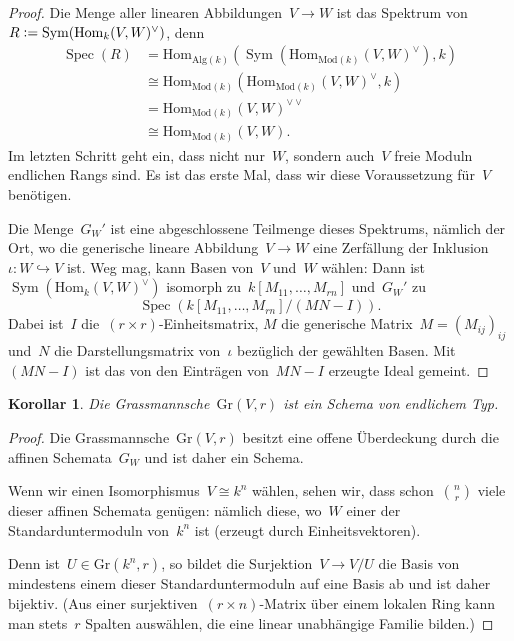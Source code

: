 \documentclass[a4paper,ngerman,12pt]{scrartcl}
\theoremstyle{definition}
\theoremstyle{plain}
\newtheorem{cor}[defn]{Korollar}
\theoremstyle{remark}
\newcommand{\Hom}{\mathrm{Hom}}
\DeclareMathOperator{\Spec}{Spec}
\DeclareMathOperator{\Sym}{Sym}
\newcommand{\defeq}{\vcentcolon=}
\newcommand{\Gr}{\mathrm{Gr}}
\begin{document}
\begin{proof}Die Menge aller linearen Abbildungen~$V \to W$ ist das Spektrum
von~$R \defeq \Sym(\Hom_k(V,W)^\vee)$, denn
\begin{align*}
  \Spec(R) &=
  \Hom_{\mathrm{Alg}(k)}(\Sym(\Hom_{\mathrm{Mod}(k)}(V,W)^\vee), k) \\
  &\cong \Hom_{\mathrm{Mod}(k)}(\Hom_{\mathrm{Mod}(k)}(V,W)^\vee, k) \\
  &=\Hom_{\mathrm{Mod}(k)}(V,W)^{\vee\vee} \\
  &\cong \Hom_{\mathrm{Mod}(k)}(V,W).
\end{align*}
Im letzten Schritt geht ein, dass nicht nur~$W$, sondern auch~$V$ freie Moduln
endlichen Rangs sind. Es ist das erste Mal, dass wir diese Voraussetzung
für~$V$ benötigen.

Die Menge~$G_W'$ ist eine abgeschlossene Teilmenge dieses Spektrums, nämlich
der Ort, wo die generische lineare Abbildung~$V \to W$ eine Zerfällung der
Inklusion~$\iota : W \hookrightarrow V$ ist. Weg mag, kann Basen von~$V$
und~$W$ wählen: Dann ist~$\Sym(\Hom_k(V,W)^\vee)$ isomorph
zu~$k[M_{11},\ldots,M_{rn}]$ und~$G_W'$ zu
\[ \Spec(k[M_{11},\ldots,M_{rn}]/(MN-I)). \]
Dabei ist~$I$ die~$(r \times r)$-Einheitsmatrix, $M$ die generische Matrix~$M =
(M_{ij})_{ij}$ und~$N$ die Darstellungsmatrix von~$\iota$ bezüglich der
gewählten Basen. Mit~$(MN-I)$ ist das von den Einträgen von~$MN-I$ erzeugte
Ideal gemeint.
\end{proof}

\begin{cor}Die Grassmannsche~$\Gr(V,r)$ ist ein Schema von endlichem
Typ.\end{cor}

\begin{proof}Die Grassmannsche~$\Gr(V,r)$ besitzt eine offene
Überdeckung durch die affinen Schemata~$G_W$ und ist daher ein Schema.

Wenn wir einen Isomorphismus~$V \cong k^n$ wählen, sehen wir, dass
schon~$\binom{n}{r}$ viele dieser affinen Schemata genügen: nämlich diese,
wo~$W$ einer der Standarduntermoduln von~$k^n$ ist (erzeugt durch
Einheitsvektoren).

Denn ist~$U \in \Gr(k^n,r)$, so bildet die Surjektion~$V \to V/U$ die Basis von
mindestens einem dieser Standarduntermoduln auf eine Basis ab und ist daher
bijektiv. (Aus einer surjektiven~$(r \times n)$-Matrix über einem lokalen Ring
kann man stets~$r$ Spalten auswählen, die eine linear unabhängige Familie
bilden.)
\end{proof}
\end{document}

